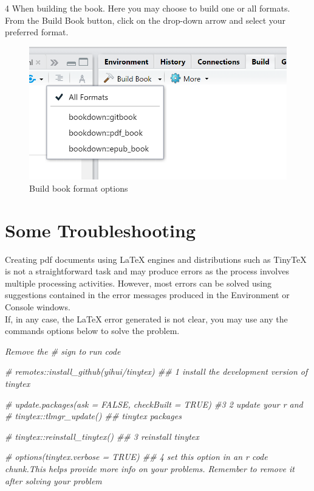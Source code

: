 \documentclass[
]{book}
\newenvironment{Shaded}{\begin{snugshade}}{\end{snugshade}}
\newcommand{\CommentTok}[1]{\textcolor[rgb]{0.56,0.35,0.01}{\textit{#1}}}
\begin{document}
4 When building the book. Here you may choose to build one or all formats. From the Build Book button, click on the drop-down arrow and select your preferred format.

\begin{figure}
\centering
\includegraphics{tutorial_screenshots/build_book_drop_down.png}
\caption{Build book format options}
\end{figure}

\hypertarget{some-troubleshooting}{%
\section{Some Troubleshooting}\label{some-troubleshooting}}

Creating pdf documents using LaTeX engines and distributions such as TinyTeX is not a straightforward task and may produce errors as the process involves multiple processing activities. However, most errors can be solved using suggestions contained in the error messages produced in the Environment or Console windows.\\
If, in any case, the LaTeX error generated is not clear, you may use any the commands options below to solve the problem.

\emph{Remove the \# sign to run code}

\begin{Shaded}
\begin{Highlighting}[]
\CommentTok{\# remotes::install\_github(\textquotesingle{}yihui/tinytex\textquotesingle{}) \#\# 1 install the development version of tinytex}

\CommentTok{\# update.packages(ask = FALSE, checkBuilt = TRUE) \#3 2 update your r and}
\CommentTok{\# tinytex::tlmgr\_update() \#\# tinytex packages}

\CommentTok{\# tinytex::reinstall\_tinytex()  \#\# 3 reinstall tinytex}

\CommentTok{\# options(tinytex.verbose = TRUE) \#\# 4 set this option in an r code chunk.This helps provide more info on your problems. Remember to remove it after solving your problem}
\end{Highlighting}
\end{Shaded}
\end{document}

